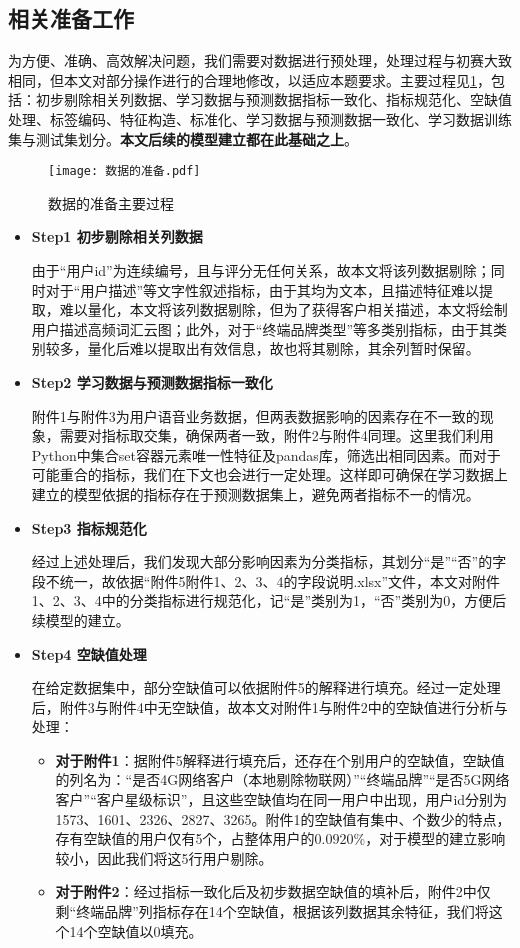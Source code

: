 \documentclass{MathorCupmodeling}
\begin{document}
	\subsection{相关准备工作}
	为方便、准确、高效解决问题，我们需要对数据进行预处理，处理过程与初赛大致相同，但本文对部分操作进行的合理地修改，以适应本题要求。主要过程见\textcolor{blue}{\cref{fig:dataprepare}}，包括：初步剔除相关列数据、学习数据与预测数据指标一致化、指标规范化、空缺值处理、标签编码、特征构造、标准化、学习数据与预测数据一致化、学习数据训练集与测试集划分。\textbf{本文后续的模型建立都在此基础之上}。
	\begin{figure}[H]
		\centerline{\texttt{[image: 数据的准备.pdf]}}
		\caption{数据的准备主要过程}\label{fig:dataprepare}
	\end{figure}
	\begin{itemize}
		\item \textbf{Step1 初步剔除相关列数据}
		
		由于“用户id”为连续编号，且与评分无任何关系，故本文将该列数据剔除；同时对于“用户描述”等文字性叙述指标，由于其均为文本，且描述特征难以提取，难以量化，本文将该列数据剔除，但为了获得客户相关描述，本文将绘制用户描述高频词汇云图；此外，对于“终端品牌类型”等多类别指标，由于其类别较多，量化后难以提取出有效信息，故也将其剔除，其余列暂时保留。

		\item \textbf{Step2 学习数据与预测数据指标一致化}
		
		附件1与附件3为用户语音业务数据，但两表数据影响的因素存在不一致的现象，需要对指标取交集，确保两者一致，附件2与附件4同理。这里我们利用Python中集合set容器元素唯一性特征及pandas库，筛选出相同因素。而对于可能重合的指标，我们在下文也会进行一定处理。这样即可确保在学习数据上建立的模型依据的指标存在于预测数据集上，避免两者指标不一的情况。

		\item \textbf{Step3 指标规范化}
		
		经过上述处理后，我们发现大部分影响因素为分类指标，其划分“是”“否”的字段不统一，故依据“附件5附件1、2、3、4的字段说明.xlsx”文件，本文对附件1、2、3、4中的分类指标进行规范化，记“是”类别为1，“否”类别为0，方便后续模型的建立。

		\item \textbf{Step4 空缺值处理}
		
		在给定数据集中，部分空缺值可以依据附件5的解释进行填充。经过一定处理后，附件3与附件4中无空缺值，故本文对附件1与附件2中的空缺值进行分析与处理：
		\begin{itemize}
			\item \textbf{对于附件1}：据附件5解释进行填充后，还存在个别用户的空缺值，空缺值的列名为：“是否4G网络客户（本地剔除物联网）”“终端品牌”“是否5G网络客户”“客户星级标识”，且这些空缺值均在同一用户中出现，用户id分别为1573、1601、2326、2827、3265。附件1的空缺值有集中、个数少的特点，存有空缺值的用户仅有5个，占整体用户的$0.0920\%$，对于模型的建立影响较小，因此我们将这5行用户剔除。
			\item \textbf{对于附件2}：经过指标一致化后及初步数据空缺值的填补后，附件2中仅剩“终端品牌”列指标存在14个空缺值，根据该列数据其余特征，我们将这个14个空缺值以0填充。
		\end{itemize}


\end{itemize}
\end{document}
